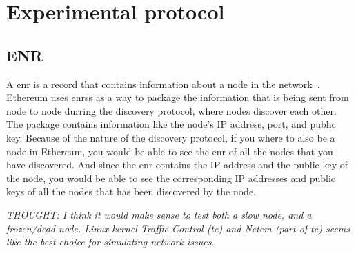 

\section{Experimental protocol}\label{sec:experimental-protocol}

\subsection{ENR}\label{subsec:enr}
A \gls{enr} is a record that contains information about a node in the network~\cite{EIP-778:Ethereum-Node-Records}.
Ethereum uses \glspl{enr}s as a way to package the information that is being sent from node to node durring the discovery protocol, where nodes discover each other.
The package contains information like the node's IP address, port, and public key.
Because of the nature of the discovery protocol, if you where to also be a node in Ethereum, you would be able to see the \gls{enr} of all the nodes that you have discovered.
And since the \gls{enr} contains the IP address and the public key of the node, you would be able to see the corresponding IP addresses and public keys of all the nodes that has been discovered by the node.



\textit{THOUGHT: I think it would make sense to test both a slow node, and a frozen/dead node.
Linux kernel Traffic Control (tc) and Netem (part of tc) seems like the best choice for simulating network issues.}